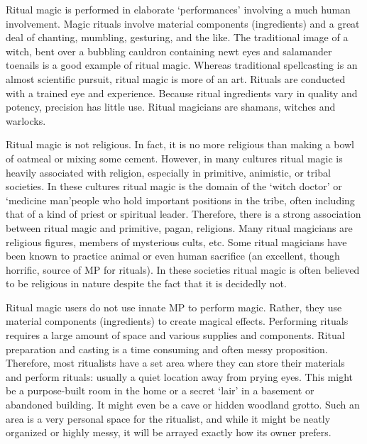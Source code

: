 \documentclass[twoside]{book}
\begin{document}
    {  
      Ritual magic is performed in elaborate
               `performances' involving a much human
               involvement. Magic rituals involve material components
               (ingredients) and a great deal of chanting, mumbling,
               gesturing, and the like. The traditional image of a witch,
               bent over a bubbling cauldron containing newt eyes and
               salamander toenails is a good example of ritual magic.
               Whereas traditional spellcasting is an almost scientific
               pursuit, ritual magic is more of an art. Rituals are
               conducted with a trained eye and experience. Because
               ritual ingredients vary in quality and potency, precision
               has little use. Ritual magicians are shamans, witches and
               warlocks. 
    }
  
    {  
      Ritual magic is not religious. In fact, it is no
               more religious than making a bowl of oatmeal or mixing
               some cement. However, in many cultures ritual magic is
               heavily associated with religion, especially in primitive,
               animistic, or tribal societies. In these cultures ritual
               magic is the domain of the `witch doctor' or
               `medicine man'people who hold important
               positions in the tribe, often including that of a kind of
               priest or spiritual leader. Therefore, there is a strong
               association between ritual magic and primitive, pagan,
               religions. Many ritual magicians are religious figures,
               members of mysterious cults, etc. Some ritual magicians
               have been known to practice animal or even human sacrifice
               (an excellent, though horrific, source of MP for rituals).
               In these societies ritual magic is often believed to be
               religious in nature despite the fact that it is decidedly
               not. 
    }
  
    {  
      Ritual magic users do not use innate MP to perform
               magic. Rather, they use material components (ingredients)
               to create magical effects. Performing rituals requires a
               large amount of space and various supplies and components.
               Ritual preparation and casting is a time consuming and
               often messy proposition. Therefore, most ritualists have a
               set area where they can store their materials and perform
               rituals: usually a quiet location away from prying eyes.
               This might be a purpose-built room in the home or a secret
               `lair' in a basement or abandoned building. It
               might even be a cave or hidden woodland grotto. Such an
               area is a very personal space for the ritualist, and while
               it might be neatly organized or highly messy, it will be
               arrayed exactly how its owner prefers. 
    }
  
\end{document}
